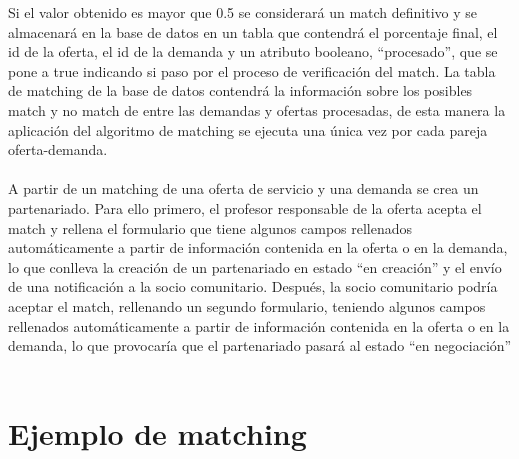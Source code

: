 \documentclass[11pt]{book}
\begin{document}
Si el valor obtenido es mayor que 0.5 se considerará un match definitivo y se almacenará en la base de datos en un tabla que contendrá el porcentaje final, el id de la oferta, el id de la demanda y un atributo booleano, “procesado”, que se pone a true indicando si paso por el proceso de verificación del match. La tabla de matching de la base de datos contendrá la información sobre los posibles match y no match de entre las demandas y ofertas procesadas, de esta manera la aplicación del algoritmo de matching se ejecuta una única vez por cada pareja oferta-demanda. \\\\

A partir de un matching de una oferta de servicio y una demanda se crea un partenariado. Para ello primero, el profesor responsable de la oferta acepta el match y rellena el formulario que tiene  algunos campos rellenados automáticamente a partir de información contenida en la oferta o en la demanda, lo que conlleva la creación de un partenariado en estado “en creación” y el envío de una notificación a la socio comunitario. Después, la socio comunitario podría aceptar el match, rellenando un segundo formulario, teniendo algunos campos rellenados automáticamente a partir de información contenida en la oferta o en la demanda, lo que provocaría que el partenariado pasará al estado “en negociación” \\\\

\section{Ejemplo de matching}
\end{document}
